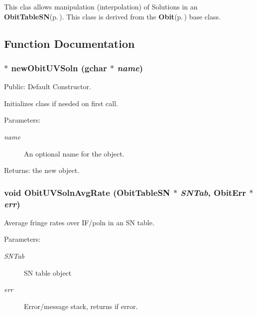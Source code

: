 This clas allows manipulation (interpolation) of Solutions in an {\bf Obit\-Table\-SN}{\rm (p.\,\pageref{structObitTableSN})}. This class is derived from the {\bf Obit}{\rm (p.\,\pageref{structObit})} base class.

\subsection{Function Documentation}
\subsubsection{$\ast$ new\-Obit\-UVSoln (gchar $\ast$ {\em name})}\label{ObitUVSoln_8c_a20}


Public: Default Constructor. 

Initializes class if needed on first call. \begin{Desc}
\item[Parameters:]
\begin{description}
\item[{\em name}]An optional name for the object. \end{description}
\end{Desc}
\begin{Desc}
\item[Returns:]the new object. \end{Desc}
\subsubsection{\setlength{\rightskip}{0pt plus 5cm}void Obit\-UVSoln\-Avg\-Rate ({\bf Obit\-Table\-SN} $\ast$ {\em SNTab}, {\bf Obit\-Err} $\ast$ {\em err})}\label{ObitUVSoln_8c_a27}


Average fringe rates over IF/poln in an SN table. 

\begin{Desc}
\item[Parameters:]
\begin{description}
\item[{\em SNTab}]SN table object \item[{\em err}]Error/message stack, returns if error. \end{description}
\end{Desc}
